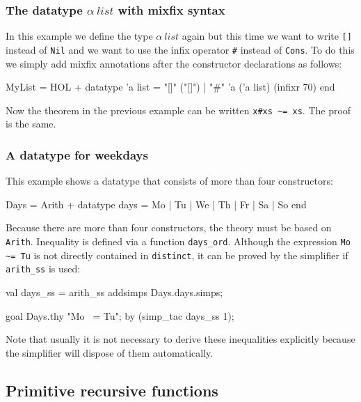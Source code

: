 \subsubsection{The datatype $\alpha~list$ with mixfix syntax}

In this example we define the type $\alpha~list$ again but this time we want
to write {\tt []} instead of {\tt Nil} and we want to use the infix operator
\verb|#| instead of {\tt Cons}. To do this we simply add mixfix annotations
after the constructor declarations as follows:
\begin{ttbox}
MyList = HOL +
  datatype 'a list = "[]" ("[]") 
                   | "#" 'a ('a list) (infixr 70)
end
\end{ttbox}
Now the theorem in the previous example can be written \verb|x#xs ~= xs|. The
proof is the same.


\subsubsection{A datatype for weekdays}

This example shows a datatype that consists of more than four constructors:
\begin{ttbox}
Days = Arith +
  datatype days = Mo | Tu | We | Th | Fr | Sa | So
end
\end{ttbox}
Because there are more than four constructors, the theory must be based on
{\tt Arith}. Inequality is defined via a function \verb|days_ord|. Although
the expression \verb|Mo ~= Tu| is not directly contained in {\tt distinct},
it can be proved by the simplifier if \verb$arith_ss$ is used:
\begin{ttbox}
val days_ss = arith_ss addsimps Days.days.simps;

goal Days.thy "Mo ~= Tu";
by (simp_tac days_ss 1);
\end{ttbox}
Note that usually it is not necessary to derive these inequalities explicitly
because the simplifier will dispose of them automatically.

\subsection{Primitive recursive functions}
\label{sec:HOL:primrec}

